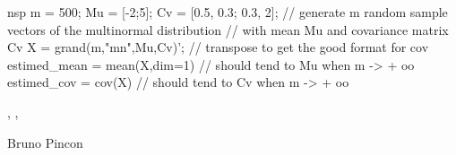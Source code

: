\begin{examples}
\begin{mintednsp}{nsp}
m = 500;
Mu = [-2;5];
Cv = [0.5, 0.3; 0.3, 2];
// generate m random sample vectors of the multinormal distribution
// with mean Mu and covariance matrix Cv 
X = grand(m,"mn",Mu,Cv)'; // transpose to get the good format for cov
estimed_mean = mean(X,dim=1)  // should tend to Mu when m -> + oo
estimed_cov = cov(X)          // should tend to Cv when m -> + oo
\end{mintednsp}
\end{examples}

\begin{manseealso}
  , , 
\end{manseealso}

\begin{authors}
  Bruno Pincon
\end{authors}
